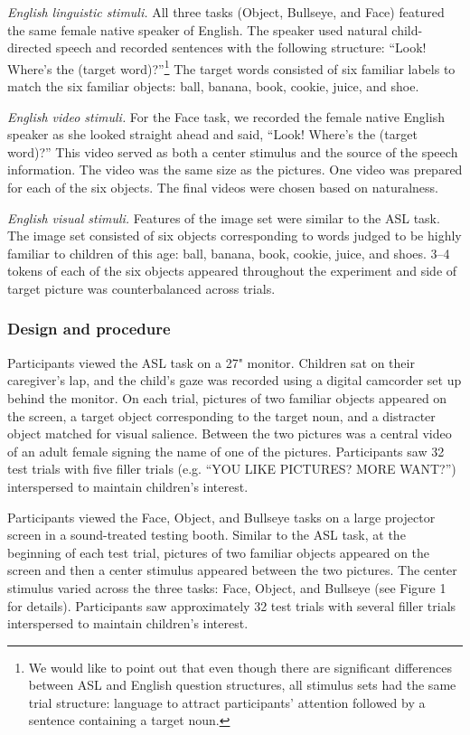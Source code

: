\documentclass[10pt, letterpaper]{article}
\begin{document}
\emph{English linguistic stimuli.} All three tasks (Object, Bullseye,
and Face) featured the same female native speaker of English. The
speaker used natural child-directed speech and recorded sentences with
the following structure: ``Look! Where's the (target word)?''\footnote{We
  would like to point out that even though there are significant
  differences between ASL and English question structures, all stimulus
  sets had the same trial structure: language to attract participants'
  attention followed by a sentence containing a target noun.} The target
words consisted of six familiar labels to match the six familiar
objects: ball, banana, book, cookie, juice, and shoe.

\emph{English video stimuli.} For the Face task, we recorded the female
native English speaker as she looked straight ahead and said, ``Look!
Where's the (target word)?'' This video served as both a center stimulus
and the source of the speech information. The video was the same size as
the pictures. One video was prepared for each of the six objects. The
final videos were chosen based on naturalness.

\emph{English visual stimuli.} Features of the image set were similar to
the ASL task. The image set consisted of six objects corresponding to
words judged to be highly familiar to children of this age: ball,
banana, book, cookie, juice, and shoes. 3--4 tokens of each of the six
objects appeared throughout the experiment and side of target picture
was counterbalanced across trials.

\subsubsection{Design and procedure}\label{design-and-procedure}

Participants viewed the ASL task on a 27" monitor. Children sat on their
caregiver's lap, and the child's gaze was recorded using a digital
camcorder set up behind the monitor. On each trial, pictures of two
familiar objects appeared on the screen, a target object corresponding
to the target noun, and a distracter object matched for visual salience.
Between the two pictures was a central video of an adult female signing
the name of one of the pictures. Participants saw 32 test trials with
five filler trials (e.g. ``YOU LIKE PICTURES? MORE WANT?'') interspersed
to maintain children's interest.

Participants viewed the Face, Object, and Bullseye tasks on a large
projector screen in a sound-treated testing booth. Similar to the ASL
task, at the beginning of each test trial, pictures of two familiar
objects appeared on the screen and then a center stimulus appeared
between the two pictures. The center stimulus varied across the three
tasks: Face, Object, and Bullseye (see Figure 1 for details).
Participants saw approximately 32 test trials with several filler trials
interspersed to maintain children's interest.
\end{document}
